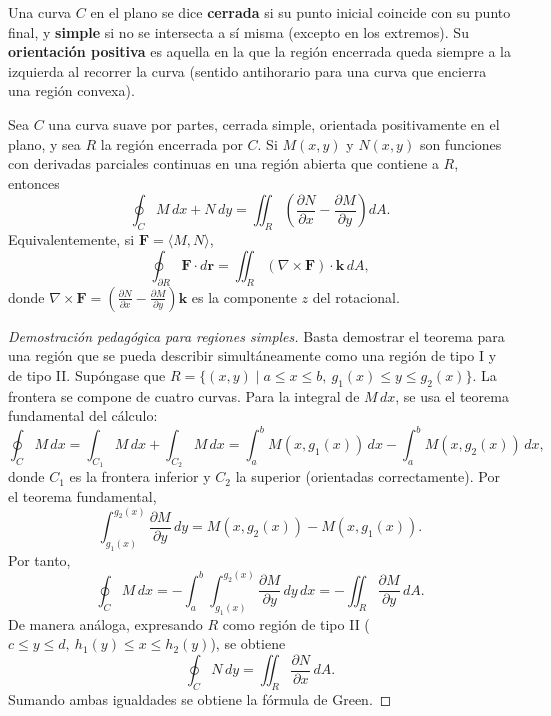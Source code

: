 \begin{definition}
Una curva $C$ en el plano se dice \textbf{cerrada} si su punto inicial
coincide con su punto final, y \textbf{simple} si no se intersecta a sí
misma (excepto en los extremos). Su \textbf{orientación positiva} es
aquella en la que la región encerrada queda siempre a la izquierda al
recorrer la curva (sentido antihorario para una curva que encierra una
región convexa).
\end{definition}

\begin{theorem}
Sea $C$ una curva suave por partes, cerrada simple, orientada
positivamente en el plano, y sea $R$ la región encerrada por $C$.
Si $M(x,y)$ y $N(x,y)$ son funciones con derivadas parciales continuas
en una región abierta que contiene a $R$, entonces
\[
\oint_C M\,dx + N\,dy
= \iint_R \left( \frac{\partial N}{\partial x} - \frac{\partial M}{\partial y} \right) dA.
\]
Equivalentemente, si $\mathbf{F} = \langle M, N \rangle$,
\[
\oint_{\partial R} \mathbf{F} \cdot d\mathbf{r}
= \iint_R (\nabla \times \mathbf{F}) \cdot \mathbf{k} \, dA,
\]
donde $\nabla \times \mathbf{F} = \left( \frac{\partial N}{\partial x}
- \frac{\partial M}{\partial y} \right) \mathbf{k}$ es la componente
$z$ del rotacional.
\end{theorem}

\begin{proof}[Demostración pedagógica para regiones simples]
Basta demostrar el teorema para una región que se pueda describir
simultáneamente como una región de tipo I y de tipo II. Supóngase que
$R = \{(x,y) \mid a \le x \le b,\ g_1(x) \le y \le g_2(x)\}$. La
frontera se compone de cuatro curvas. Para la integral de $M\,dx$,
se usa el teorema fundamental del cálculo:
\[
\oint_C M\,dx
= \int_{C_1} M\,dx + \int_{C_2} M\,dx
= \int_a^b M(x,g_1(x))\,dx - \int_a^b M(x,g_2(x))\,dx,
\]
donde $C_1$ es la frontera inferior y $C_2$ la superior (orientadas
correctamente). Por el teorema fundamental,
\[
\int_{g_1(x)}^{g_2(x)} \frac{\partial M}{\partial y}\,dy
= M(x,g_2(x)) - M(x,g_1(x)).
\]
Por tanto,
\[
\oint_C M\,dx = - \int_a^b \int_{g_1(x)}^{g_2(x)}
\frac{\partial M}{\partial y}\,dy\,dx
= -\iint_R \frac{\partial M}{\partial y}\,dA.
\]
De manera análoga, expresando $R$ como región de tipo II
($c \le y \le d,\ h_1(y) \le x \le h_2(y)$), se obtiene
\[
\oint_C N\,dy = \iint_R \frac{\partial N}{\partial x}\,dA.
\]
Sumando ambas igualdades se obtiene la fórmula de Green.
\end{proof}

